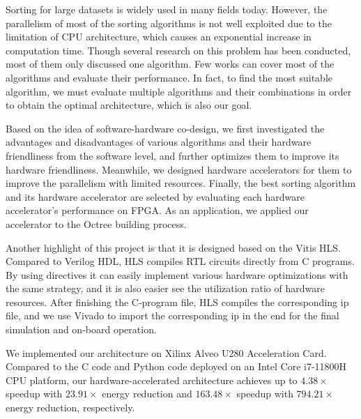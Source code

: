 \begin{abstract*}

Sorting for large datasets is widely used in many fields today. However, the parallelism of most of the sorting algorithms is not well exploited due to the limitation of CPU architecture, which causes an exponential increase in computation time. Though several research on this problem has been conducted, most of them only discussed one algorithm. Few works can cover most of the algorithms and evaluate their performance. In fact, to find the most suitable algorithm, we must evaluate multiple algorithms and their combinations in order to obtain the optimal architecture, which is also our goal.


Based on the idea of software-hardware co-design, we first investigated the advantages and disadvantages of various algorithms and their hardware friendliness from the software level, and further optimizes them to improve its hardware friendliness. Meanwhile, we designed hardware accelerators for them to improve the parallelism with limited resources. Finally, the best sorting algorithm and its hardware accelerator are selected by evaluating each hardware accelerator's performance on FPGA. As an application, we applied our accelerator to the Octree building process.

Another highlight of this project is that it is designed based on the Vitis HLS. Compared to Verilog HDL, HLS compiles RTL circuits directly from C programs. By using directives it can easily implement various hardware optimizations with the same strategy, and it is also easier see the utilization ratio of hardware resources. After finishing the C-program file, HLS compiles the corresponding ip file, and we use Vivado to import the corresponding ip in the end for the final simulation and on-board operation.

We implemented our architecture on Xilinx Alveo U280 Acceleration Card. Compared to the C code and Python code deployed on an Intel Core i7-11800H CPU platform, our hardware-accelerated architecture achieves up to $4.38\times$ speedup with $23.91\times$ energy reduction and $163.48\times$ speedup with $794.21\times$ energy reduction, respectively.


\end{abstract*}
